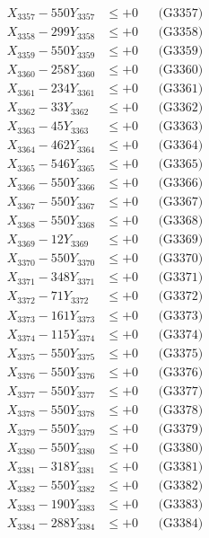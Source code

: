 \documentclass[a4paper,10pt]{article}
\begin{document}
{\begin{align}
X_{3357} - 550Y_{3357} &\leq +0 && \text{(G3357)} \\
X_{3358} - 299Y_{3358} &\leq +0 && \text{(G3358)} \\
X_{3359} - 550Y_{3359} &\leq +0 && \text{(G3359)} \\
X_{3360} - 258Y_{3360} &\leq +0 && \text{(G3360)} \\
\allowbreak
X_{3361} - 234Y_{3361} &\leq +0 && \text{(G3361)} \\
X_{3362} - 33Y_{3362} &\leq +0 && \text{(G3362)} \\
X_{3363} - 45Y_{3363} &\leq +0 && \text{(G3363)} \\
X_{3364} - 462Y_{3364} &\leq +0 && \text{(G3364)} \\
X_{3365} - 546Y_{3365} &\leq +0 && \text{(G3365)} \\
X_{3366} - 550Y_{3366} &\leq +0 && \text{(G3366)} \\
X_{3367} - 550Y_{3367} &\leq +0 && \text{(G3367)} \\
X_{3368} - 550Y_{3368} &\leq +0 && \text{(G3368)} \\
X_{3369} - 12Y_{3369} &\leq +0 && \text{(G3369)} \\
X_{3370} - 550Y_{3370} &\leq +0 && \text{(G3370)} \\
\allowbreak
X_{3371} - 348Y_{3371} &\leq +0 && \text{(G3371)} \\
X_{3372} - 71Y_{3372} &\leq +0 && \text{(G3372)} \\
X_{3373} - 161Y_{3373} &\leq +0 && \text{(G3373)} \\
X_{3374} - 115Y_{3374} &\leq +0 && \text{(G3374)} \\
X_{3375} - 550Y_{3375} &\leq +0 && \text{(G3375)} \\
X_{3376} - 550Y_{3376} &\leq +0 && \text{(G3376)} \\
X_{3377} - 550Y_{3377} &\leq +0 && \text{(G3377)} \\
X_{3378} - 550Y_{3378} &\leq +0 && \text{(G3378)} \\
X_{3379} - 550Y_{3379} &\leq +0 && \text{(G3379)} \\
X_{3380} - 550Y_{3380} &\leq +0 && \text{(G3380)} \\
\allowbreak
X_{3381} - 318Y_{3381} &\leq +0 && \text{(G3381)} \\
X_{3382} - 550Y_{3382} &\leq +0 && \text{(G3382)} \\
X_{3383} - 190Y_{3383} &\leq +0 && \text{(G3383)} \\
X_{3384} - 288Y_{3384} &\leq +0 && \text{(G3384)} \\

\end{align}}
\end{document}
